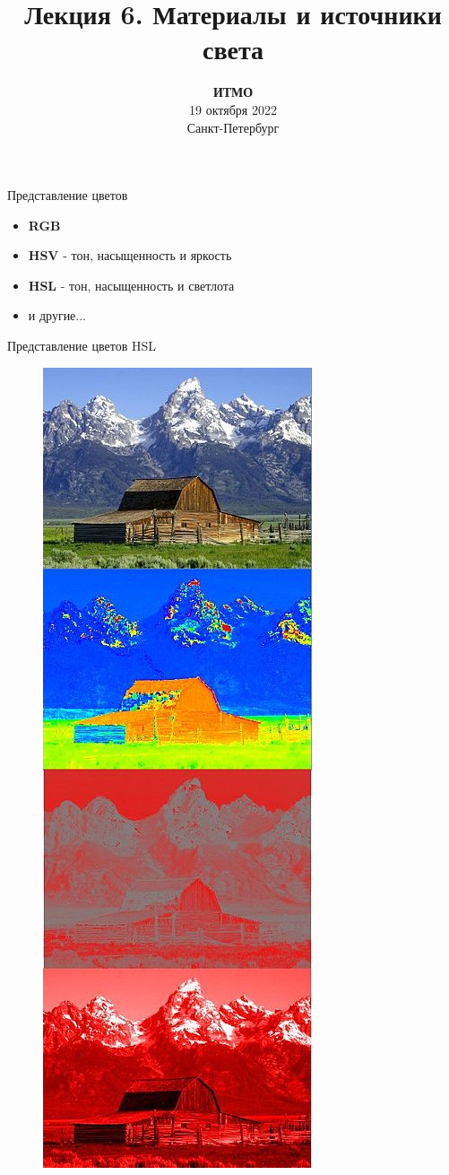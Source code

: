 \documentclass[aspectration=1610,t]{beamer}
\title{Лекция 6. Материалы и источники света}
\date{
   \textbf{ИТМО}\\
   19 октября 2022\\
   Санкт-Петербург
}
\begin{document}
\begin{frame}
  \titlepage
\end{frame}

\begin{frame}[fragile]{Представление цветов}
    \begin{itemize}
        \item {\bf RGB}
        \item {\bf HSV} - тон, насыщенность и яркость
        \item {\bf HSL} - тон, насыщенность и светлота
        \item и другие...
    \end{itemize}
\end{frame}

\begin{frame}[fragile]{Представление цветов HSL}
    \begin{figure}[htp]
        \centering
        \includegraphics[scale=0.20]{res/hsl}
    \end{figure}
\end{frame}
\end{document}
